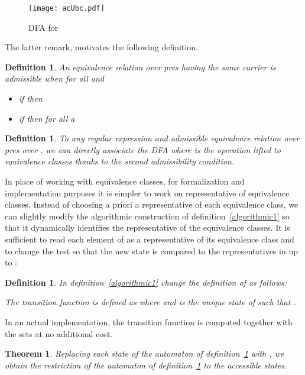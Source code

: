 \documentclass[preprint]{sigplanconf}
\newcounter{item}
\newtheorem{theorem}[item]{Theorem}
\newtheorem{definition}[item]{Definition}
\begin{document}
\begin{figure}[tp]
\begin{center}
\texttt{[image: acUbc.pdf]}
\caption{DFA for \label{acUbc}}
\end{center}
\end{figure}



\noindent
The latter remark, motivates the following definition.

\begin{definition}
An equivalence relation  over pres having the same carrier is admissible when for all  and 
\begin{itemize}
\item if  then 
\item if  then for all a 
\end{itemize}
\end{definition}

\begin{definition}\label{nonalgorithmic2}
To any regular expression  and admissible equivalence relation over pres over
, we can directly associate the DFA
 where  is the  operation lifted to equivalence classes
thanks to the second admissibility condition.
\end{definition}

In place of working with equivalence classes, for formalization and implementation purposes it is simpler to work on representative of equivalence classes.
Instead of choosing a priori a representative of each equivalence class, we can slightly modify the algorithmic construction of definition~\ref{algorithmic1} so
that it dynamically identifies the representative of the equivalence classes.
It is sufficient to read each element of  as a representative of its
equivalence class and to change the test  so that the new
state  is compared to the representatives in  up to :

\begin{definition}\label{algorithmic2}
In definition~\ref{algorithmic1} change the definition of  as follows:
 
The transition function  is defined as  where
 and  is the unique state of  such that
.
\end{definition}
In an actual implementation, the transition function  is computed together
with the sets  at no additional cost.

\begin{theorem}
Replacing each state  of the automaton of definition~\ref{algorithmic2}
with , we obtain the restriction of the automaton of
definition~\ref{nonalgorithmic2} to the accessible states.
\end{theorem}
\end{document}
